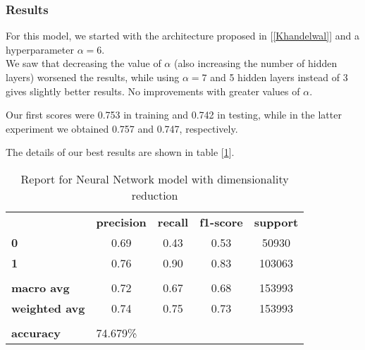 \subsubsection{Results}

For this model, we started with the architecture proposed in [\ref{Khandelwal}] and a hyperparameter $\alpha=6$.\\
We saw that decreasing the value of $\alpha$ (also increasing the number of hidden layers) worsened the results, while using $\alpha=7$ and 5 hidden layers instead of 3 gives slightly better results. No improvements with greater values of $\alpha$.

Our first scores were 0.753 in training and 0.742 in testing, while in the latter experiment we obtained 0.757 and 0.747, respectively.

The details of our best results are shown in table [\ref{tab:nn-res-1}].

\begin{table}[h!]
    \centering
    \begin{tabular}{lcccc}
        \rowcolor[HTML]{EEEEEE} 
        \cellcolor[HTML]{FBFBFB} & \textbf{precision} & \textbf{recall} & \textbf{f1-score} & \textbf{support} \\
        \rowcolor[HTML]{EEEEEE} 
        \textbf{0}               & 0.69               & 0.43            & 0.53              & 50930            \\
        \rowcolor[HTML]{EEEEEE} 
        \textbf{1}               & 0.76               & 0.90            & 0.83              & 103063           \\
        \rowcolor[HTML]{FBFBFB} 
        &                    &                 &                   &                  \\
        \rowcolor[HTML]{EEEEEE} 
        \textbf{macro avg}       & 0.72               & 0.67            & 0.68              & 153993           \\
        \rowcolor[HTML]{EEEEEE} 
        \textbf{weighted avg}    & 0.74               & 0.75            & 0.73              & 153993           \\
        \rowcolor[HTML]{FBFBFB} 
        &                    &                 &                   &                  \\
        \rowcolor[HTML]{EEEEEE} 
        \textbf{accuracy}        & \multicolumn{4}{l}{\cellcolor[HTML]{EEEEEE}74.679\%}                         
    \end{tabular}
    \caption{Report for Neural Network model with dimensionality reduction}
    \label{tab:nn-res-1}
\end{table}

